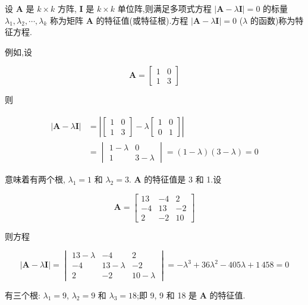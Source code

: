 \quad 设 $\bm{A}$ 是 $k \times k$ 方阵, $\bm{I}$ 是 $k \times k$ 单位阵,则满足多项式方程 $|\bm{A} - \lambda\bm{I}| = 0$ 的标量 $\lambda_1, \lambda_2, \cdots, \lambda_k$ 称为矩阵 $\bm{A}$ 的特征值(或特征根).方程 $|\bm{A} - \lambda\bm{I}| = 0$ ($\lambda$ 的函数)称为特征方程.

例如,设

\[
\bm{A} = \begin{bmatrix} 1 & 0 \\ 1 & 3 \end{bmatrix}
\]

则

\begin{equation*}
\begin{aligned}
|\bm{A} - \lambda\bm{I}| &= \left|\begin{bmatrix} 1 & 0 \\ 1 & 3 \end{bmatrix} - \lambda\begin{bmatrix} 1 & 0 \\ 0 & 1 \end{bmatrix}\right| \\
&= \begin{vmatrix} 1 - \lambda & 0 \\ 1 & 3 - \lambda \end{vmatrix} = (1 - \lambda)(3 - \lambda) = 0
\end{aligned}
\end{equation*}

意味着有两个根, $\lambda_1 = 1$ 和 $\lambda_2 = 3$. $\bm{A}$ 的特征值是 3 和 1.设

\[
\bm{A} = \begin{bmatrix} 13 & -4 & 2 \\ -4 & 13 & -2 \\ 2 & -2 & 10 \end{bmatrix}
\]

则方程

\[
|\bm{A} - \lambda\bm{I}| = \begin{vmatrix} 13 - \lambda & -4 & 2 \\ -4 & 13 - \lambda & -2 \\ 2 & -2 & 10 - \lambda \end{vmatrix} = -\lambda^3 + 36\lambda^2 - 405\lambda + 1\,458 = 0
\]

有三个根: $\lambda_1 = 9$, $\lambda_2 = 9$ 和 $\lambda_3 = 18$;即 9, 9 和 18 是 $\bm{A}$ 的特征值.
